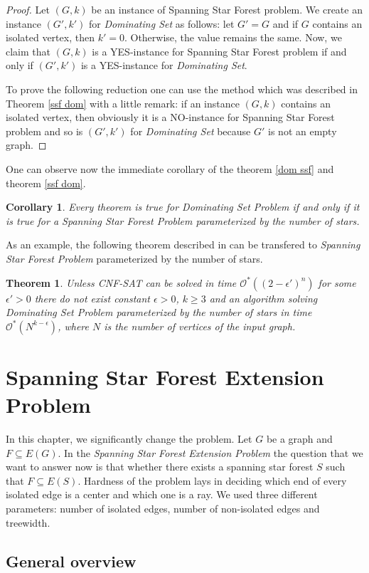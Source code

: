 \documentclass[en]{pracamgr}
\newtheorem{theorem}{Theorem}
\newtheorem{corollary}{Corollary}
\newcommand{\ssf}{spanning star forest}
\newcommand{\ssfp}{{\sc Spanning Star Forest} problem}
\newcommand{\domset}{\emph{Dominating Set}}
\newcommand{\domsetp}{{\sc Dominating Set Problem}}
\newcommand{\kssf}{\emph{Spanning Star Forest Problem} parameterized by the number of stars}
\newcommand{\cnfsat}{\emph{CNF-SAT}}
\newcommand{\ssfe}{\emph{Spanning Star Forest Extension Problem}}
\begin{document}
\begin{proof}
	Let $(G,k)$ be an instance of \ssfp{}. We create an instance $(G',k')$ for \domset{} as follows: let $G'=G$ and if $G$ contains an isolated vertex, then $k'=0$. Otherwise, the value remains the same. Now, we claim that $(G,k)$ is a YES-instance for \ssfp{} if and only if $(G',k')$ is a YES-instance for \domset.
	
	To prove the following reduction one can use the method which was described in Theorem \ref{ssf dom} with a little remark: if an instance $(G,k)$ contains an isolated vertex, then obviously it is a NO-instance for \ssfp{} and so is $(G',k')$ for \domset{} because $G'$ is not an empty graph.
\end{proof}

One can observe now the immediate corollary of the theorem \ref{dom ssf} and theorem \ref{ssf dom}.

\begin{corollary}
	Every theorem is true for \domsetp{} if and only if it is true for a \kssf{}.
\end{corollary}

As an example, the following theorem described in 
can be transfered to \kssf{}.

\begin{theorem}
	Unless \cnfsat{} can be solved in time $\mathcal{O}^*((2-\epsilon')^n)$ for some $\epsilon' > 0$ there do not exist constant $\epsilon > 0$, $k \geq 3$ and an algorithm solving \domsetp{} parameterized by the number of stars in time $\mathcal{O}^*(N^{k-\epsilon})$, where $N$ is the number of vertices of the input graph. 
\end{theorem}

\chapter{Spanning Star Forest Extension Problem}

In this chapter, we significantly change the problem. Let $G$ be a graph and $F \subseteq E(G)$. In the \ssfe{} the question that we want to answer now is that whether there exists a \ssf{} $S$ such that $F \subseteq E(S)$. Hardness of the problem lays in deciding which end of every isolated edge is a center and which one is a ray. We used three different parameters: number of isolated edges, number of non-isolated edges and treewidth. 

\section{General overview}
\end{document}
